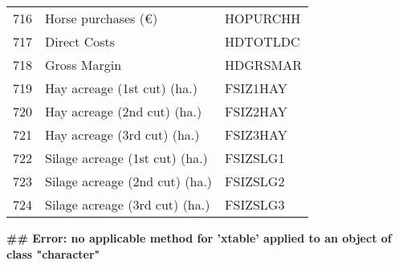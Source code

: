 \documentclass{article}\usepackage{graphicx, color}
\makeatletter
\newenvironment{kframe}{%
 \def\at@end@of@kframe{}%
 \ifinner\ifhmode%
  \def\at@end@of@kframe{\end{minipage}}%
  \begin{minipage}{\columnwidth}%
 \fi\fi%
 \def\FrameCommand##1{\hskip\@totalleftmargin \hskip-\fboxsep
 \colorbox{shadecolor}{##1}\hskip-\fboxsep
     \hskip-\linewidth \hskip-\@totalleftmargin \hskip\columnwidth}%
 \MakeFramed {\advance\hsize-\width
   \@totalleftmargin\z@ \linewidth\hsize
   \@setminipage}}%
 {\par\unskip\endMakeFramed%
 \at@end@of@kframe}
\makeatother
\begin{document}
\begin{flushleft}
\begin{table}[ht]
\begin{center}
\begin{tabular}{rll}
  716 & Horse purchases    (€) & HOPURCHH \\ 
  717 & Direct Costs & HDTOTLDC \\ 
  718 & Gross Margin & HDGRSMAR \\ 
  719 & Hay acreage (1st cut)    (ha.) & FSIZ1HAY \\ 
  720 & Hay acreage (2nd cut)    (ha.) & FSIZ2HAY \\ 
  721 & Hay acreage (3rd cut)    (ha.) & FSIZ3HAY \\ 
  722 & Silage acreage (1st cut) (ha.) & FSIZSLG1 \\ 
  723 & Silage acreage (2nd cut) (ha.) & FSIZSLG2 \\ 
  724 & Silage acreage (3rd cut) (ha.) & FSIZSLG3 \\ 
   \hline
\end{tabular}
\end{center}
\end{table}
\begin{kframe}

{\ttfamily\noindent\bfseries\textcolor{errorcolor}{\#\# Error: no applicable method for 'xtable' applied to an object of class "character"}}\end{kframe}





\end{flushleft}
\end{document}
